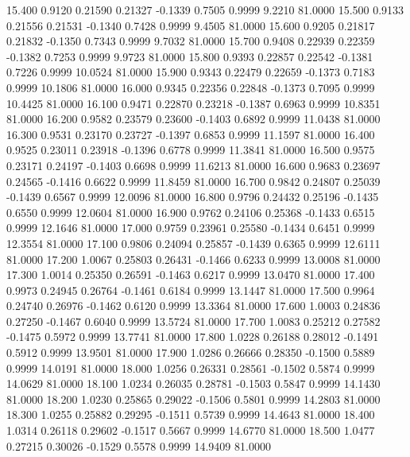   15.400   0.9120   0.21590   0.21327  -0.1339   0.7505   0.9999   9.2210  81.0000
  15.500   0.9133   0.21556   0.21531  -0.1340   0.7428   0.9999   9.4505  81.0000
  15.600   0.9205   0.21817   0.21832  -0.1350   0.7343   0.9999   9.7032  81.0000
  15.700   0.9408   0.22939   0.22359  -0.1382   0.7253   0.9999   9.9723  81.0000
  15.800   0.9393   0.22857   0.22542  -0.1381   0.7226   0.9999  10.0524  81.0000
  15.900   0.9343   0.22479   0.22659  -0.1373   0.7183   0.9999  10.1806  81.0000
  16.000   0.9345   0.22356   0.22848  -0.1373   0.7095   0.9999  10.4425  81.0000
  16.100   0.9471   0.22870   0.23218  -0.1387   0.6963   0.9999  10.8351  81.0000
  16.200   0.9582   0.23579   0.23600  -0.1403   0.6892   0.9999  11.0438  81.0000
  16.300   0.9531   0.23170   0.23727  -0.1397   0.6853   0.9999  11.1597  81.0000
  16.400   0.9525   0.23011   0.23918  -0.1396   0.6778   0.9999  11.3841  81.0000
  16.500   0.9575   0.23171   0.24197  -0.1403   0.6698   0.9999  11.6213  81.0000
  16.600   0.9683   0.23697   0.24565  -0.1416   0.6622   0.9999  11.8459  81.0000
  16.700   0.9842   0.24807   0.25039  -0.1439   0.6567   0.9999  12.0096  81.0000
  16.800   0.9796   0.24432   0.25196  -0.1435   0.6550   0.9999  12.0604  81.0000
  16.900   0.9762   0.24106   0.25368  -0.1433   0.6515   0.9999  12.1646  81.0000
  17.000   0.9759   0.23961   0.25580  -0.1434   0.6451   0.9999  12.3554  81.0000
  17.100   0.9806   0.24094   0.25857  -0.1439   0.6365   0.9999  12.6111  81.0000
  17.200   1.0067   0.25803   0.26431  -0.1466   0.6233   0.9999  13.0008  81.0000
  17.300   1.0014   0.25350   0.26591  -0.1463   0.6217   0.9999  13.0470  81.0000
  17.400   0.9973   0.24945   0.26764  -0.1461   0.6184   0.9999  13.1447  81.0000
  17.500   0.9964   0.24740   0.26976  -0.1462   0.6120   0.9999  13.3364  81.0000
  17.600   1.0003   0.24836   0.27250  -0.1467   0.6040   0.9999  13.5724  81.0000
  17.700   1.0083   0.25212   0.27582  -0.1475   0.5972   0.9999  13.7741  81.0000
  17.800   1.0228   0.26188   0.28012  -0.1491   0.5912   0.9999  13.9501  81.0000
  17.900   1.0286   0.26666   0.28350  -0.1500   0.5889   0.9999  14.0191  81.0000
  18.000   1.0256   0.26331   0.28561  -0.1502   0.5874   0.9999  14.0629  81.0000
  18.100   1.0234   0.26035   0.28781  -0.1503   0.5847   0.9999  14.1430  81.0000
  18.200   1.0230   0.25865   0.29022  -0.1506   0.5801   0.9999  14.2803  81.0000
  18.300   1.0255   0.25882   0.29295  -0.1511   0.5739   0.9999  14.4643  81.0000
  18.400   1.0314   0.26118   0.29602  -0.1517   0.5667   0.9999  14.6770  81.0000
  18.500   1.0477   0.27215   0.30026  -0.1529   0.5578   0.9999  14.9409  81.0000

